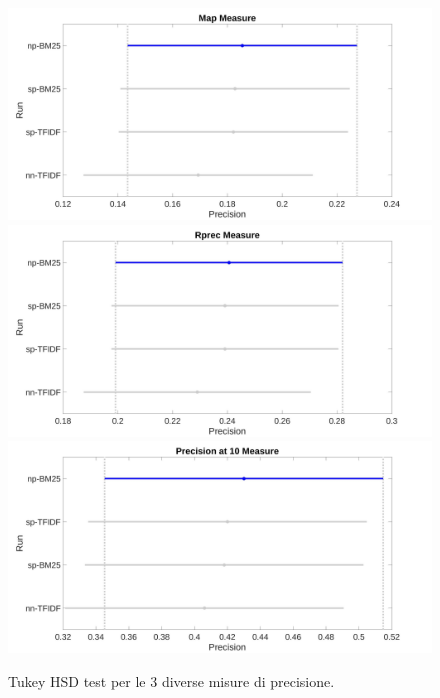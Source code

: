 \documentclass[a4paper, 11pt]{article}
\begin{document}
\begin{figure}[!htb]
  \includegraphics[width=\linewidth]{../Plots/mean-tukey.jpeg}
\endminipage\hfill
{}
  \includegraphics[width=\linewidth]{../Plots/rprec-tukey.jpeg}
\endminipage\hfill
{}%
  \includegraphics[width=\linewidth]{../Plots/p10-tukey.jpeg}
\endminipage
\caption{Tukey HSD test per le 3 diverse misure di precisione.}
\end{figure}
\end{document}
